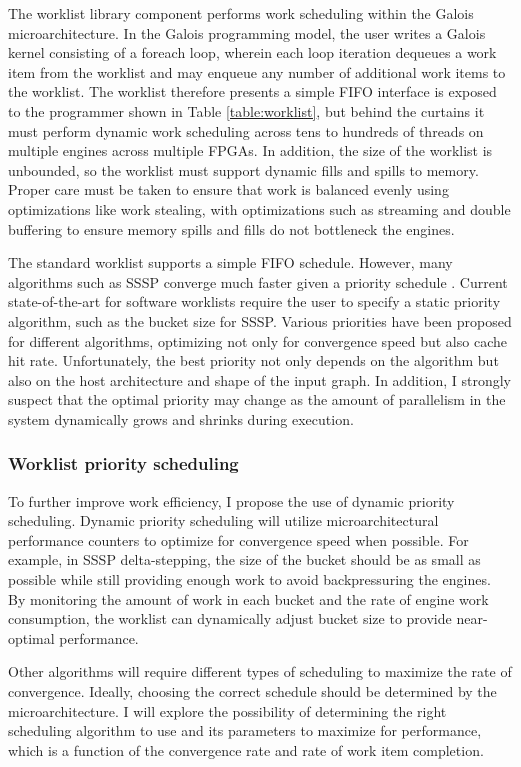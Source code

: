 The worklist library component performs work scheduling within the Galois microarchitecture. In the Galois programming 
model, the user writes a Galois kernel consisting of a foreach loop, wherein each loop iteration dequeues a work item 
from the worklist and may enqueue any number of additional work items to the worklist. The worklist therefore presents 
a simple FIFO interface is exposed to the programmer shown in Table \ref{table:worklist}, but behind the curtains it 
must perform dynamic work scheduling across tens to hundreds of threads on multiple engines across multiple FPGAs. In 
addition, the size of the worklist is unbounded, so the worklist must support dynamic fills and spills to memory. 
Proper care must be taken to ensure that work is balanced evenly using optimizations like work stealing, with 
optimizations such as streaming and double buffering to ensure memory spills and fills do not bottleneck the engines.

The standard worklist supports a simple FIFO schedule. However, many algorithms such as SSSP converge much faster 
given a priority schedule \cite{galoisOrdering}. Current state-of-the-art for software worklists require the user to 
specify a static priority algorithm, such as the bucket size for SSSP. Various priorities have been proposed for 
different algorithms, optimizing not only for convergence speed but also cache hit rate. Unfortunately, the best 
priority not only depends on the algorithm but also on the host architecture and shape of the input graph. In 
addition, I strongly suspect that the optimal priority may change as the amount of parallelism in the system 
dynamically grows and shrinks during execution.

\subsubsection{Worklist priority scheduling}

To further improve work efficiency, I propose the use of dynamic priority scheduling. Dynamic priority scheduling will 
utilize microarchitectural performance counters to optimize for convergence speed when possible. For example, in SSSP 
delta-stepping, the size of the bucket should be as small as possible while still providing enough work to avoid 
backpressuring the engines. By monitoring the amount of work in each bucket and the rate of engine work consumption, the 
worklist can dynamically adjust bucket size to provide near-optimal performance.

Other algorithms will require different types of scheduling to maximize the rate of convergence. Ideally, choosing the 
correct schedule should be determined by the microarchitecture. I will explore the possibility of determining the right 
scheduling algorithm to use and its parameters to maximize for performance, 
which is a function of the convergence rate and rate of work item completion.

